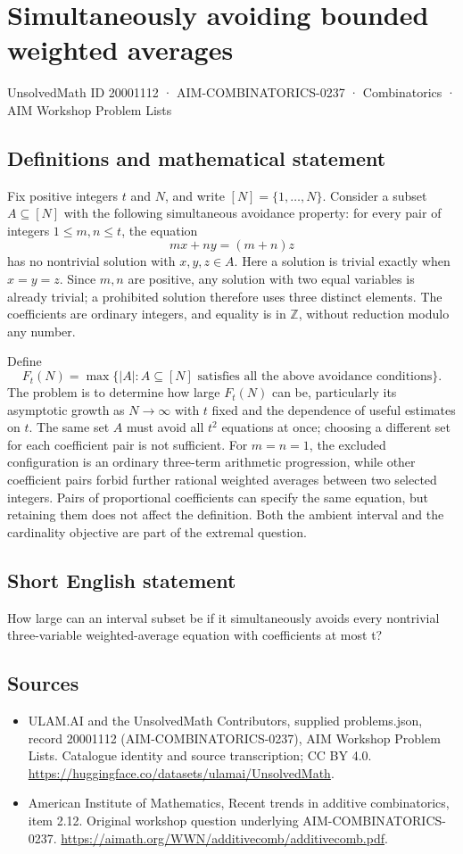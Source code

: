 \documentclass[11pt,a4paper]{article}
\begin{document}
\section*{Simultaneously avoiding bounded weighted averages}\label{20001112}
{\small UnsolvedMath ID 20001112 · AIM-COMBINATORICS-0237 · Combinatorics · AIM Workshop Problem Lists}
\subsection{Definitions and mathematical statement}
Fix positive integers $t$ and $N$, and write $[N]=\{1,\ldots,N\}$.
Consider a subset $A\subseteq[N]$ with the following simultaneous
avoidance property: for every pair of integers $1\le m,n\le t$,
the equation
\[
                              mx+ny=(m+n)z
\]
has no nontrivial solution with $x,y,z\in A$. Here a solution is
trivial exactly when $x=y=z$. Since $m,n$ are positive, any solution
with two equal variables is already trivial; a prohibited solution
therefore uses three distinct elements. The coefficients are ordinary
integers, and equality is in $\mathbb Z$, without reduction modulo
any number.

Define
\[
 F_t(N)=\max\{|A|:A\subseteq[N]\text{ satisfies all the above
                                          avoidance conditions}\}.
\]
The problem is to determine how large $F_t(N)$ can be, particularly
its asymptotic growth as $N\to\infty$ with $t$ fixed and the dependence
of useful estimates on $t$.
The same set $A$ must avoid all $t^2$ equations at once; choosing
a different set for each coefficient pair is not sufficient.
For $m=n=1$, the excluded configuration is an ordinary three-term
arithmetic progression, while other coefficient pairs forbid further
rational weighted averages between two selected integers. Pairs of
proportional coefficients can specify the same equation, but retaining
them does not affect the definition. Both the ambient interval and
the cardinality objective are part of the extremal question.
\subsection{Short English statement}
How large can an interval subset be if it simultaneously avoids every nontrivial three-variable weighted-average equation with coefficients at most t?
\subsection{Sources}
\begin{itemize}
\item[S1] ULAM.AI and the UnsolvedMath Contributors, supplied problems.json, record 20001112 (AIM-COMBINATORICS-0237), AIM Workshop Problem Lists. Catalogue identity and source transcription; CC BY 4.0.
\url{https://huggingface.co/datasets/ulamai/UnsolvedMath}.
\item[S2] American Institute of Mathematics, Recent trends in additive combinatorics, item 2.12. Original workshop question underlying AIM-COMBINATORICS-0237.
\url{https://aimath.org/WWN/additivecomb/additivecomb.pdf}.
\end{itemize}
\end{document}
